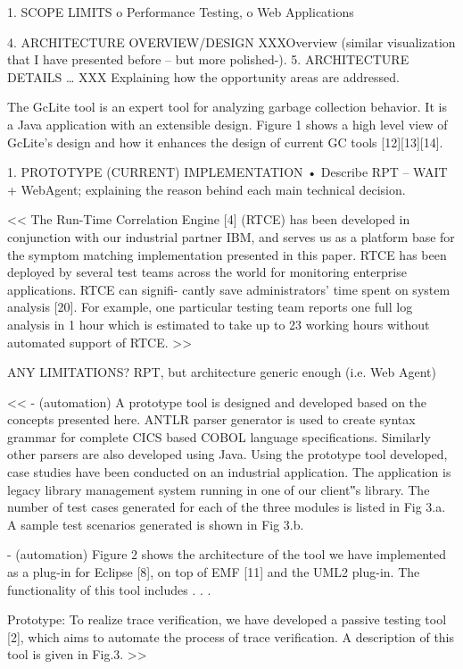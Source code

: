 \documentclass[runningheads,a4paper]{llncs}
\begin{document}
1.	SCOPE LIMITS
o	Performance Testing, 
o	Web Applications

4.	ARCHITECTURE OVERVIEW/DESIGN
XXXOverview (similar visualization that I have presented before – but more polished-).
5.	ARCHITECTURE DETAILS …
XXX Explaining how the opportunity areas are addressed.

The GcLite tool is an expert tool for analyzing garbage
collection behavior. It is a Java application with an extensible design. Figure 1 shows a high level view of GcLite’s design and how it
enhances the design of current GC tools
[12][13][14].

1.	PROTOTYPE (CURRENT) IMPLEMENTATION
•	Describe RPT – WAIT + WebAgent; explaining the reason behind each main technical decision.

<<
The Run-Time Correlation Engine [4] (RTCE) has been developed in conjunction
with our industrial partner IBM, and serves us as a platform base for the symptom 
matching implementation presented in this paper. RTCE has been deployed by several test 
teams across the world for monitoring enterprise applications. RTCE can signifi- cantly 
save administrators’ time spent on system analysis [20]. For example, one particular 
testing team reports one full log analysis in 1 hour which is estimated to take up to 23 
working hours without automated support of RTCE.
>>

ANY LIMITATIONS?
RPT, but architecture generic enough (i.e. Web Agent)

<<
- (automation) A prototype tool is designed and developed based on the concepts presented here.
ANTLR parser generator is used to create syntax grammar for complete CICS based
COBOL language specifications. Similarly other parsers are also developed using
Java. Using the prototype tool developed, case studies have been conducted on an
industrial application. The application is legacy library management system running
in one of our client‟s library. The number of test cases generated for each of the three
modules is listed in Fig 3.a. A sample test scenarios generated is shown in Fig 3.b.

- (automation) Figure 2 shows the architecture of the tool we have implemented as a plug-in for
Eclipse [8], on top of EMF [11] and the UML2 plug-in. The functionality of this tool
includes . . .

Prototype: To realize trace verification, we have developed a passive testing tool [2], which
aims to automate the process of trace verification. A description of this tool is
given in Fig.3.
>>
\end{document}
